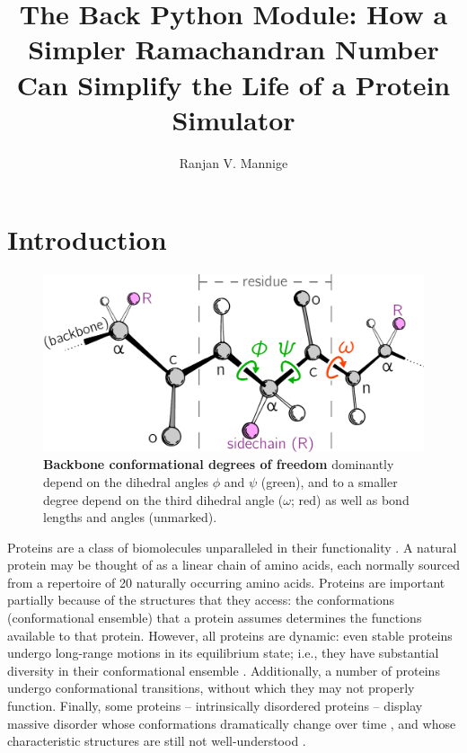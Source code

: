 \documentclass[fleqn,10pt,lineno]{wlpeerj} %
\title{The Back\n{MAP} Python Module: How a Simpler Ramachandran Number Can Simplify the Life of a Protein Simulator}
\author[1,*]{Ranjan V. Mannige}
\affil[1]{~Multiscale Institute, Berkeley Lake, GA 30092, U.S.A.}
\affil[*]{~ranjanmannige@gmail.com}
\begin{document}
\flushbottom
\maketitle
\thispagestyle{empty}

\section*{Introduction}

\begin{figure}[b!]
\centering
\includegraphics[width=0.4\linewidth]{figures/peptide_small.pdf}
\caption{\textbf{Backbone conformational degrees of freedom} dominantly depend on the dihedral angles $\phi$ and $\psi$ (green), and to a smaller degree depend on the third dihedral angle ($\omega$; red) as well as bond lengths and angles (unmarked). \label{fig:intro}} 
\end{figure}

Proteins are a class of biomolecules unparalleled in their functionality \citep{Berg2006}. A natural protein may be thought of as a linear chain of amino acids, each normally sourced from a repertoire of 20 naturally occurring amino acids. 
Proteins are important partially because of the structures that they access: the conformations (conformational ensemble) that a protein assumes determines the functions available to that protein. However, all proteins are dynamic: even stable proteins undergo long-range motions in its equilibrium state; i.e., they have substantial diversity in their conformational ensemble \citep{James2003,James2003a,Oldfield2005,Tokuriki2009,Schad2011,Vertessy2011,Mannige2014b}. Additionally, a number of proteins undergo conformational transitions, without which they may not properly function. Finally, some proteins -- intrinsically disordered proteins -- display massive disorder whose conformations dramatically change over time \citep{Uversky2003, Fink2005, Midic2009, Espinoza-Fonseca2009, Uversky2010, Tompa2011, Sibille2012, Kosol2013, Dunker2013, Geist2013, Baruah2015}, and whose characteristic structures are still not well-understood \citep{Beck2008}.
\end{document}
